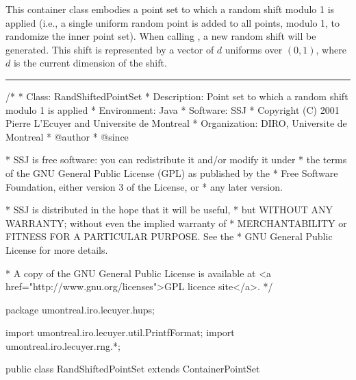 
%
This container class embodies a point set to which a random shift
modulo 1 is applied (i.e., a single uniform random point is added
to all points, modulo 1, to randomize the inner point set).
When calling , a new random shift will be generated.
This shift is represented by a vector of $d$ uniforms over $(0,1)$,
where $d$ is the current dimension of the shift.



\bigskip\hrule\bigskip

\begin{code}
\begin{hide}
/*
 * Class:        RandShiftedPointSet
 * Description:  Point set to which a random shift modulo 1 is applied
 * Environment:  Java
 * Software:     SSJ 
 * Copyright (C) 2001  Pierre L'Ecuyer and Universite de Montreal
 * Organization: DIRO, Universite de Montreal
 * @author       
 * @since

 * SSJ is free software: you can redistribute it and/or modify it under
 * the terms of the GNU General Public License (GPL) as published by the
 * Free Software Foundation, either version 3 of the License, or
 * any later version.

 * SSJ is distributed in the hope that it will be useful,
 * but WITHOUT ANY WARRANTY; without even the implied warranty of
 * MERCHANTABILITY or FITNESS FOR A PARTICULAR PURPOSE.  See the
 * GNU General Public License for more details.

 * A copy of the GNU General Public License is available at
   <a href="http://www.gnu.org/licenses">GPL licence site</a>.
 */
\end{hide}
package umontreal.iro.lecuyer.hups;\begin{hide}

import umontreal.iro.lecuyer.util.PrintfFormat;
import umontreal.iro.lecuyer.rng.*;
\end{hide}

public class RandShiftedPointSet extends ContainerPointSet \begin{hide} {

   protected double[] shift;           // The random shift.
   protected int dimShift = 0;         // Current dimension of the shift.
   protected int capacityShift = 0;    // Number of array elements;
                                       // always >= dimShift.
   protected RandomStream shiftStream; // Used to generate random shifts.
\end{hide}
\end{code}


